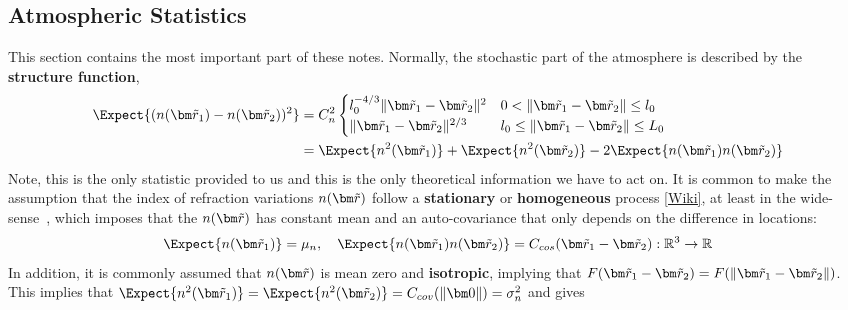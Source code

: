 \subsection{Atmospheric Statistics}
This section contains the most important part of these notes.  Normally, the stochastic part 
of the atmosphere is described by the \textbf{structure function},
\begin{equation}\label{EQ:structure_function_0}
\begin{split}
  \Expect{(n(\vect{\dim{r}}_1) - n(\vect{\dim{r}}_2))^2} &= 
  C_n^2  \begin{cases}
        l_{0}^{-4/3} \|\vect{\dim{r}}_1-\vect{\dim{r}}_2\|^{2} & 0 < \|\vect{\dim{r}}_1-\vect{\dim{r}}_2\| \leq l_{0} \\
       \|\vect{\dim{r}}_1 - \vect{\dim{r}}_2 \|^{2/3} &  l_{0}  \leq \|\vect{\dim{r}}_1 - \vect{\dim{r}}_2\| \leq  L_{0}  \\
   \end{cases}\\
   &= \Expect{n^2(\vect{\dim{r}}_1)} +  \Expect{n^2(\vect{\dim{r}}_2)} - 2\Expect{n(\vect{\dim{r}}_1)n(\vect{\dim{r}}_2)} \\
\end{split}
\end{equation}
Note, this is the only statistic provided to us and this is the only theoretical information we have to act on.
It is common to make the assumption that the index of refraction variations $n(\vect{\dim{r}})$ follow a 
\textbf{stationary} or \textbf{homogeneous} process \href{https://en.wikipedia.org/wiki/Stationary_process}{[Wiki]}, 
at least in the wide-sense~\cite{Wiley_Goodman_1985}, which imposes 
that the $n(\vect{\dim{r}})$ has constant mean and an auto-covariance that only depends on the difference in locations:
 \begin{equation}\label{EQ:structure_function_0}
\begin{split}
  \Expect{n(\vect{\dim{r}}_1)} = \mu_{n}, \quad \Expect{n(\vect{\dim{r}}_1)n(\vect{\dim{r}}_2)} = C_{cos}(\vect{\dim{r}}_1-\vect{\dim{r}}_2):\mathbb{R}^3 \to \mathbb{R}
\end{split}
\end{equation}
In addition, it is commonly assumed that $n(\vect{\dim{r}})$ is mean zero and \textbf{isotropic}, 
implying that $F(\vect{\dim{r}}_1-\vect{\dim{r}}_2) = F(\|\vect{\dim{r}}_1-\vect{\dim{r}}_2\|)$.
This implies that $\Expect{n^2(\vect{\dim{r}}_1)} = \Expect{n^2(\vect{\dim{r}}_2)} = C_{cov}(\| \vect{0} \|) = \sigma_{n}^{2}$ 
and gives  
